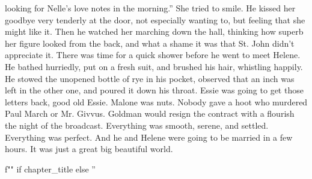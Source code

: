 \documentclass{novel}
\begin{document}
looking for Nelle’s love notes in the morning.” She tried to smile. He kissed her goodbye very tenderly at the door, not especially wanting to, but feeling that she might like it. Then he watched her marching down the hall, thinking how superb her figure looked from the back, and what a shame it was that St. John didn’t appreciate it. There was time for a quick shower before he went to meet Helene. He bathed hurriedly, put on a fresh suit, and brushed his hair, whistling happily. He stowed the unopened bottle of rye in his pocket, observed that an inch was left in the other one, and poured it down his throat. Essie was going to get those letters back, good old Essie. Malone was nuts. Nobody gave a hoot who murdered Paul March or Mr. Givvus. Goldman would resign the contract with a flourish the night of the broadcast. Everything was smooth, serene, and settled. Everything was perfect. And he and Helene were going to be married in a few hours. It was just a great big beautiful world.

\begin{ChapterStart}
\vspace{3\nbs}
f"" if chapter_title else ''
\end{ChapterStart}
\end{document}
